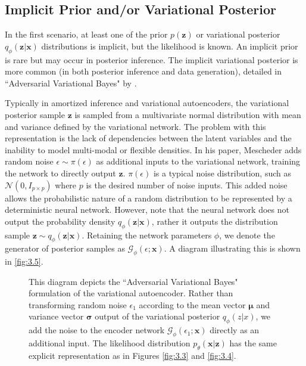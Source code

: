\documentclass[honours,12pt]{unswthesis}
\numberwithin{equation}{section}
\theoremstyle{definition}
\begin{document}
\subsection{Implicit Prior and/or Variational Posterior}\label{sec:3.8.1}
In the first scenario, at least one of the prior $p(\bm{z})$ or variational posterior $q_\phi(\bm{z}|\bm{x})$ distributions is implicit, but the likelihood is known. An implicit prior is rare but may occur in posterior inference. The implicit variational posterior is more common (in both posterior inference and data generation), detailed in ``Adversarial Variational Bayes" by \citet{mescheder}.

Typically in amortized inference and variational autoencoders, the variational posterior sample $\bm{z}$ is sampled from a multivariate normal distribution with mean and variance defined by the variational network. The problem with this representation is the lack of dependencies between the latent variables and the inability to model multi-modal or flexible densities. In his paper, Mescheder adds random noise $\epsilon\sim \pi(\epsilon)$ as additional inputs to the variational network, training the network to directly output $\bm{z}$. $\pi(\epsilon)$ is a typical noise distribution, such as $\mathcal{N}(0,I_{p\times p})$ where $p$ is the desired number of noise inputs. This added noise allows the probabilistic nature of a random distribution to be represented by a deterministic neural network. However, note that the neural network does not output the probability density $q_\phi(\bm{z}|\bm{x})$, rather it outputs the distribution sample $\bm{z}\sim q_\phi(\bm{z}|\bm{x})$. Retaining the network parameters $\phi$, we denote the generator of posterior samples as $\mathcal{G}_\phi(\epsilon;\bm{x})$. A diagram illustrating this is shown in \autoref{fig:3.5}.\\
\begin{figure}[h]
  \centering
   \caption{\small This diagram depicts the ``Adversarial Variational Bayes" formulation of the variational autoencoder. Rather than transforming random noise $\epsilon_1$ according to the mean vector $\bm{\mu}$ and variance vector $\bm{\sigma}$ output of the variational posterior $q_\phi(z|x)$, we add the noise to the encoder network $\mathcal{G}_\phi(\epsilon_1;\bm{x})$ directly as an additional input. The likelihood distribution $p_\theta(\bm{x}|\bm{z})$ has the same explicit representation as in Figures \ref{fig:3.3} and \ref{fig:3.4}.}
   \label{fig:3.5}
\end{figure}
\end{document}
